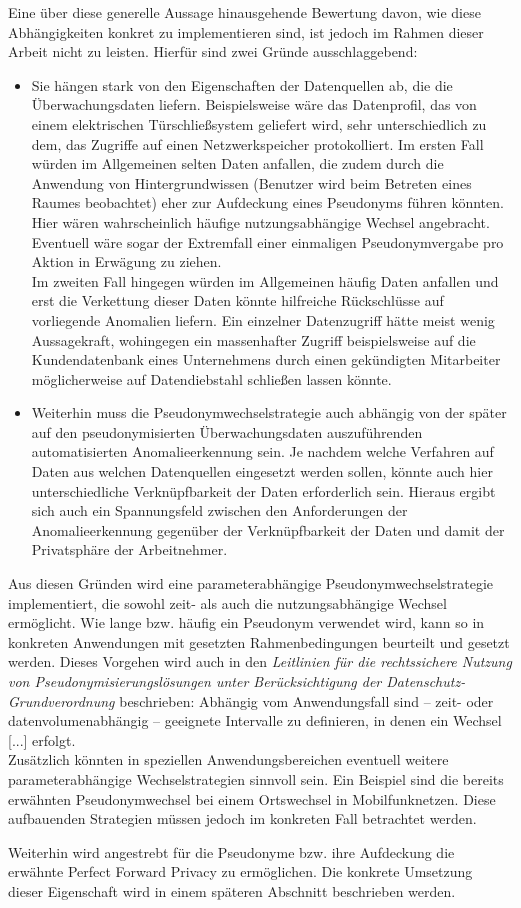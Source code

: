 Eine über diese generelle Aussage hinausgehende Bewertung davon, wie diese Abhängigkeiten konkret zu implementieren sind, ist jedoch im Rahmen dieser Arbeit nicht zu leisten. Hierfür sind zwei Gründe ausschlaggebend:
\begin{itemize}
  \item Sie hängen stark von den Eigenschaften der Datenquellen ab, die die Überwachungsdaten liefern. Beispielsweise wäre das Datenprofil, das von einem elektrischen Türschließsystem geliefert wird, sehr unterschiedlich zu dem, das Zugriffe auf einen Netzwerkspeicher protokolliert. Im ersten Fall würden im Allgemeinen selten Daten anfallen, die zudem durch die Anwendung von Hintergrundwissen (Benutzer wird beim Betreten eines Raumes beobachtet) eher zur Aufdeckung eines Pseudonyms führen könnten. Hier wären wahrscheinlich häufige nutzungsabhängige Wechsel angebracht. Eventuell wäre sogar der Extremfall einer einmaligen Pseudonymvergabe pro Aktion in Erwägung zu ziehen.\\
  Im zweiten Fall hingegen würden im Allgemeinen häufig Daten anfallen und erst die Verkettung dieser Daten könnte hilfreiche Rückschlüsse auf vorliegende Anomalien liefern. Ein einzelner Datenzugriff hätte meist wenig Aussagekraft, wohingegen ein massenhafter Zugriff beispielsweise auf die Kundendatenbank eines Unternehmens durch einen gekündigten Mitarbeiter möglicherweise auf Datendiebstahl schließen lassen könnte.
  
  \item Weiterhin muss die Pseudonymwechselstrategie auch abhängig von der später auf den pseudonymisierten Überwachungsdaten auszuführenden automatisierten Anomalieerkennung sein. Je nachdem welche Verfahren auf Daten aus welchen Datenquellen eingesetzt werden sollen, könnte auch hier unterschiedliche Verknüpfbarkeit der Daten erforderlich sein. Hieraus ergibt sich auch ein Spannungsfeld zwischen den Anforderungen der Anomalieerkennung gegenüber der Verknüpfbarkeit der Daten und damit der Privatsphäre der Arbeitnehmer.
\end{itemize}

Aus diesen Gründen wird eine parameterabhängige Pseudonymwechselstrategie implementiert, die sowohl zeit- als auch die nutzungsabhängige Wechsel ermöglicht. Wie lange bzw. häufig ein Pseudonym verwendet wird, kann so in konkreten Anwendungen mit gesetzten Rahmenbedingungen beurteilt und gesetzt werden.
Dieses Vorgehen wird auch in den \textit{Leitlinien für die rechtssichere Nutzung von Pseudonymisierungslösungen unter Berücksichtigung der Datenschutz-Grundverordnung} beschrieben: \glqq Abhängig vom Anwendungsfall sind – zeit- oder datenvolumenabhängig – geeignete Intervalle zu definieren, in denen ein Wechsel [...] erfolgt.\grqq{}\cite{schwartmann2017} \\
Zusätzlich könnten in speziellen Anwendungsbereichen eventuell weitere parameterabhängige Wechselstrategien sinnvoll sein. Ein Beispiel sind die bereits erwähnten Pseudonymwechsel bei einem Ortswechsel in Mobilfunknetzen. Diese aufbauenden Strategien müssen jedoch im konkreten Fall betrachtet werden.

Weiterhin wird angestrebt für die Pseudonyme bzw. ihre Aufdeckung die erwähnte Perfect Forward Privacy zu ermöglichen. Die konkrete Umsetzung dieser Eigenschaft wird in einem späteren Abschnitt beschrieben werden.